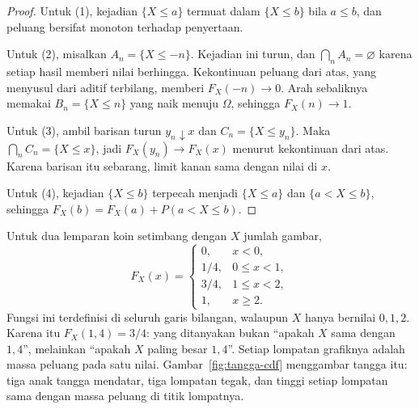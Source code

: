 \begin{proof}
Untuk (1), kejadian $\{X\le a\}$ termuat dalam $\{X\le b\}$ bila $a\le b$, dan
peluang bersifat monoton terhadap penyertaan.

Untuk (2), misalkan $A_n=\{X\le -n\}$. Kejadian ini turun, dan
$\bigcap_n A_n=\varnothing$ karena setiap hasil memberi nilai berhingga. Kekontinuan
peluang dari atas, yang menyusul dari aditif terbilang, memberi $F_X(-n)\to0$. Arah
sebaliknya memakai $B_n=\{X\le n\}$ yang naik menuju $\Omega$, sehingga
$F_X(n)\to1$.

Untuk (3), ambil barisan turun $y_n\downarrow x$ dan $C_n=\{X\le y_n\}$. Maka
$\bigcap_n C_n=\{X\le x\}$, jadi $F_X(y_n)\to F_X(x)$ menurut kekontinuan dari atas.
Karena barisan itu sebarang, limit kanan sama dengan nilai di $x$.

Untuk (4), kejadian $\{X\le b\}$ terpecah menjadi $\{X\le a\}$ dan $\{a<X\le b\}$,
sehingga $F_X(b)=F_X(a)+P(a<X\le b)$.
\end{proof}

Untuk dua lemparan koin setimbang dengan $X$ jumlah gambar,
\[
F_X(x)=\begin{cases}
0, & x<0,\\
1/4, & 0\le x<1,\\
3/4, & 1\le x<2,\\
1, & x\ge 2.
\end{cases}
\]
Fungsi ini terdefinisi di seluruh garis bilangan, walaupun $X$ hanya bernilai $0,1,2$.
Karena itu $F_X(1{,}4)=3/4$: yang ditanyakan bukan ``apakah $X$ sama dengan $1{,}4$'',
melainkan ``apakah $X$ paling besar $1{,}4$''. Setiap lompatan grafiknya adalah massa
peluang pada satu nilai. Gambar~\ref{fig:tangga-cdf} menggambar tangga itu: tiga anak
tangga mendatar, tiga lompatan tegak, dan tinggi setiap lompatan sama dengan massa
peluang di titik lompatnya.

